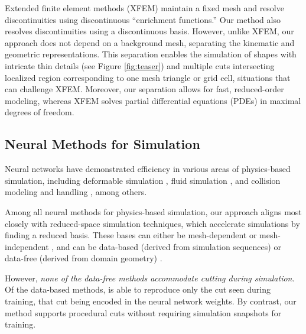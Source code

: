 Extended finite element methods (XFEM) \cite{Moes:1999:XFEM, Kaufmann:2019:enrich, Koschier:2017:RobustXFEM, xfemCutting2024} maintain a fixed mesh and resolve discontinuities using discontinuous ``enrichment functions.'' Our method also resolves  discontinuities using a discontinuous basis. However, unlike XFEM, our approach does not depend on a background mesh, separating the kinematic and geometric representations. This separation enables the simulation of shapes with intricate thin details (see Figure \ref{fig:teaser}) and multiple cuts intersecting localized region corresponding to one mesh triangle or grid cell, situations that can challenge XFEM. Moreover, our separation allows for fast, reduced-order modeling, whereas XFEM solves partial differential equations (PDEs) in maximal degrees of freedom. 

\subsection{Neural Methods for Simulation}

Neural networks have demonstrated efficiency in various areas of physics-based simulation, including deformable simulation \citep{CHEN:CROM-MPM:2023, Feng:2024:NAH, lyu2024accelerate}, fluid simulation \citep{kim2019deep, deng2023neural, 10.1145/3641519.3657438, tao2024neural}, and collision modeling and handling \citep{Romero:LCCHSD:2021, yang2020learning, Cai:2022:CSDF}, among others.

Among all neural methods for physics-based simulation, our approach aligns most closely with reduced-space simulation techniques, which accelerate simulations by finding a reduced basis. These bases can either be mesh-dependent \citep{Fulton:LSD:2018, shen2021high} or mesh-independent \citep{chang:2023:licrom}, and can be data-based (derived from simulation sequences) \citep{chen2023crom, zong2023neural} or data-free (derived from domain geometry) \citep{Sharp:2023:datafree, Modi:2024:Simplicits}. 

However, \emph{none of the data-free methods accommodate cutting during simulation}. Of the data-based methods, \citet{chang:2023:licrom} is able to reproduce only the cut seen during training, that cut being encoded in the neural network weights. By contrast, our method supports procedural cuts without requiring simulation snapshots for training.

